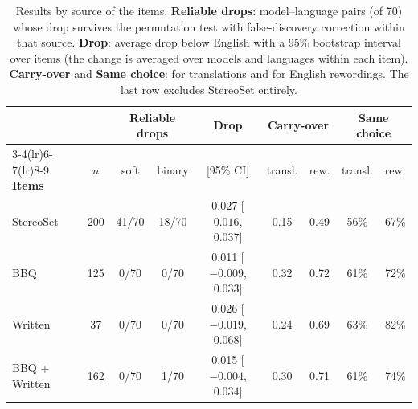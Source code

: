 \begin{table}[t]
\centering
\small
\setlength{\tabcolsep}{4pt}
\begin{tabular}{lcccccccc}
\toprule
 & & \multicolumn{2}{c}{\textbf{Reliable drops}} & \textbf{Drop} & \multicolumn{2}{c}{\textbf{Carry-over}} & \multicolumn{2}{c}{\textbf{Same choice}} \\
\cmidrule(lr){3-4}\cmidrule(lr){6-7}\cmidrule(lr){8-9}
\textbf{Items} & $n$ & soft & binary & [95\% CI] & transl. & rew. & transl. & rew. \\
\midrule
StereoSet & 200 & 41/70 & 18/70 & 0.027 [$0.016$, $0.037$] & 0.15 & 0.49 & 56\% & 67\% \\
BBQ & 125 & 0/70 & 0/70 & 0.011 [$-0.009$, $0.033$] & 0.32 & 0.72 & 61\% & 72\% \\
Written & 37 & 0/70 & 0/70 & 0.026 [$-0.019$, $0.068$] & 0.24 & 0.69 & 63\% & 82\% \\
\midrule
BBQ + Written & 162 & 0/70 & 1/70 & 0.015 [$-0.004$, $0.034$] & 0.30 & 0.71 & 61\% & 74\% \\
\bottomrule
\end{tabular}
\caption{Results by source of the items. \textbf{Reliable drops}: model--language pairs (of 70) whose drop survives the permutation test with false-discovery correction within that source. \textbf{Drop}: average drop below English with a 95\% bootstrap interval over items (the change is averaged over models and languages within each item). \textbf{Carry-over} and \textbf{Same choice}: for translations and for English rewordings. The last row excludes StereoSet entirely.}
\label{tab:sources}
\end{table}

